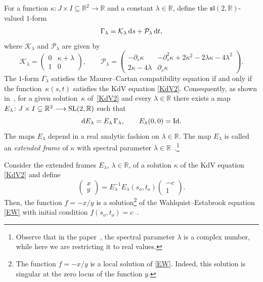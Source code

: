 \documentclass[pdftex]{sigma}
\numberwithin{equation}{section}
\def\bending{\kappa}
\def\R{\mathbb{R}}
\def\SL{{\rm SL}(2,\R)}
\begin{document}
For a function $\bending\colon J\times I\subseteq\R^2\longrightarrow\R$ and a constant $\lambda\in\R$, define the $\mathfrak{sl}(2,\R)$-valued $1$-form
\begin{equation}\label{alpha}
	\Gamma_{\lambda}=\mathcal{K}_\lambda\,{\rm d}s+\mathcal{P}_\lambda\,{\rm d}t,
\end{equation}
where $\mathcal{K}_\lambda$ and $\mathcal{P}_\lambda$ are given by
\begin{equation}\label{KP}
	\mathcal{K}_\lambda=\begin{pmatrix} 0 & \bending+\lambda \\ 1 & 0\end{pmatrix}, \qquad \mathcal{P}_\lambda=\begin{pmatrix} -\partial_s\bending & -\partial_s^2\bending+2\bending^2-2\lambda\bending-4\lambda^2 \\ 2\bending-4\lambda & \partial_s\bending \end{pmatrix}.
\end{equation}
The $1$-form $\Gamma_{\lambda}$ satisfies the Maurer--Cartan compatibility equation if and only if the function~$\bending(s,t)$ satisfies the KdV equation \eqref{KdV2}. Consequently, as shown in~\cite{ZF}, for a given solution~$\bending$ of~\eqref{KdV2} and every $\lambda\in\R$ there exists a map $E_\lambda\colon J\times I\subseteq\R^2\longrightarrow\SL$ such that%
\begin{equation}\label{dE}
	{\rm d}E_\lambda=E_\lambda\,\Gamma_{\lambda},\qquad E_\lambda(0,0)={\rm Id}.
\end{equation}
The maps $E_\lambda$ depend in a real analytic fashion on $\lambda\in\R$. The map $E_\lambda$ is called an \emph{extended frame} of $\bending$ with spectral parameter $\lambda\in\R$~\cite{TU}.\footnote{Observe that in the paper~\cite{TU}, the spectral parameter $\lambda$ is a complex number, while here we are restricting it to real values.}

Consider the extended frames $E_\lambda$, $\lambda\in\R$, of a solution $\bending$ of the KdV equation \eqref{KdV2} and define\begin{equation}\label{TF}
	\begin{pmatrix} x \\ y \end{pmatrix}=E_\lambda^{-1}E_\lambda(s_o,t_o)\begin{pmatrix} -c \\ 1 \end{pmatrix}.
\end{equation}
Then, the function $f=-x/y$ is a solution\footnote{The function $f=-x/y$ is a local solution of \eqref{EW}. Indeed, this solution is singular at the zero locus of the function $y$.} of the Wahlquist--Estabrook equation \eqref{EW} with initial condition $f(s_o,t_o)=c$~\cite{TU}.
\end{document}
